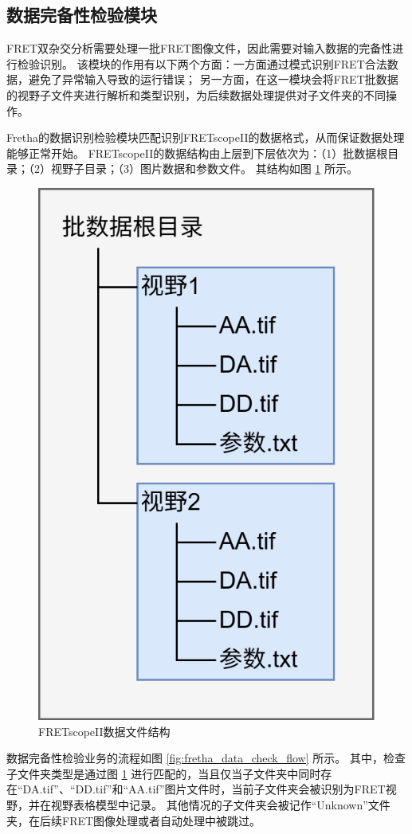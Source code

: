 \subsection{数据完备性检验模块}

FRET双杂交分析需要处理一批FRET图像文件，因此需要对输入数据的完备性进行检验识别。
该模块的作用有以下两个方面：一方面通过模式识别FRET合法数据，避免了异常输入导致的运行错误；
另一方面，在这一模块会将FRET批数据的视野子文件夹进行解析和类型识别，为后续数据处理提供对子文件夹的不同操作。

Fretha的数据识别检验模块匹配识别FRETscopeII的数据格式，从而保证数据处理能够正常开始。
FRETscopeII的数据结构由上层到下层依次为：（1）批数据根目录；（2）视野子目录；（3）图片数据和参数文件。
其结构如图 \ref{fig:fretscope_data_struct} 所示。

\begin{figure}[htbp]
    \centering
    \includegraphics[height=0.5\linewidth]{../figures/2/2_FRETscopeII数据格式.drawio.png}
    \caption{FRETscopeII数据文件结构}
    \label{fig:fretscope_data_struct}
\end{figure}

数据完备性检验业务的流程如图 \ref{fig:fretha_data_check_flow} 所示。
其中，检查子文件夹类型是通过图 \ref{fig:fretscope_data_struct} 进行匹配的，当且仅当子文件夹中同时存在“DA.tif”、“DD.tif”和“AA.tif”图片文件时，当前子文件夹会被识别为FRET视野，并在视野表格模型中记录。
其他情况的子文件夹会被记作“Unknown”文件夹，在后续FRET图像处理或者自动处理中被跳过。

